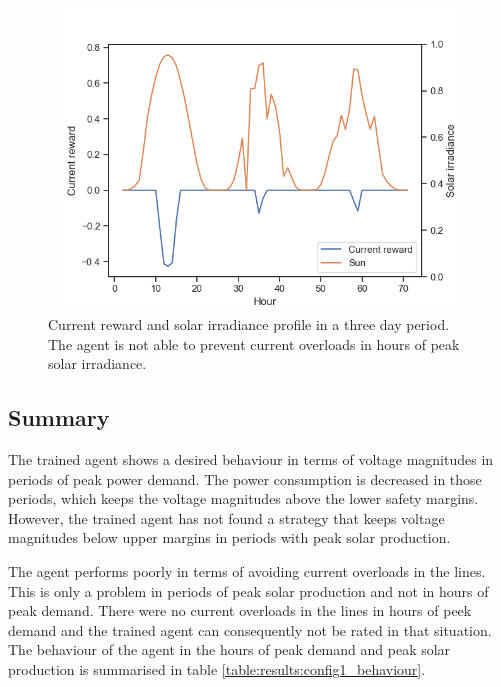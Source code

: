 \documentclass[class=book, crop=false]{standalone}
\begin{document}
\begin{figure}[H]
    \center
\includegraphics[height=8cm, width=12cm]{figures/config1_bad_current.png}
    \caption[size = 9]{Current reward and solar irradiance profile in a three day period. The agent is not able to prevent current overloads in hours of peak solar irradiance.}
    \label{fig:results:config1_bad_current}
\end{figure}


\subsection{Summary}
The trained agent shows a desired behaviour in terms of voltage magnitudes in periods of peak power demand. The power consumption is decreased in those periods, which keeps the voltage magnitudes above the lower safety margins. However, the trained agent has not found a strategy that keeps voltage magnitudes below upper margins in periods with peak solar production.

The agent performs poorly in terms of avoiding current overloads in the lines. This is only a problem in periods of peak solar production and not in hours of peak demand. There were no current overloads in the lines in hours of peek demand and the trained agent can consequently not be rated in that situation. The behaviour of the agent in the hours of peak demand and peak solar production is summarised in table \ref{table:results:config1_behaviour}.
\end{document}
